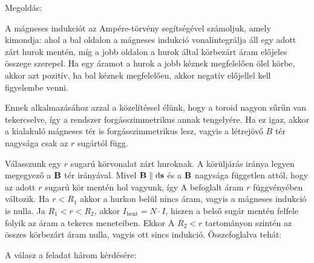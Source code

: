 
\ifdefined\megoldas
  
 Megoldás: 

 A mágneses indukciót az Amp\'ere-törvény segítségével számoljuk, amely kimondja:
 ahol a bal oldalon a mágneses indukció vonalintegrálja áll egy adott zárt hurok mentén, míg a jobb oldalon a hurok által körbezárt áram előjeles összege szerepel. Ha egy áramot a hurok a jobb kéznek megfelelően ölel körbe, akkor azt pozitív, ha bal kéznek megfelelően, akkor negatív előjellel kell figyelembe venni.

 Ennek alkalmazásához azzal a közelítéssel élünk, hogy a toroid nagyon sűrűn van tekercselve, így a rendszer forgásszimmetrikus annak tengelyére. Ha ez igaz, akkor a kialakuló mágneses tér is forgásszimmetrikus lesz, vagyis a létrejövő $B$ tér nagysága csak az $r$ sugártól függ. 

 Válasszunk egy $r$ sugarú körvonalat zárt huroknak. A körüljárás iránya legyen megegyező a $\mathbf{B}$ tér irányával. Mivel $\mathbf{B}\parallel \mathrm{d}\mathbf{s}$ és a $\mathbf{B}$ nagysága független attól, hogy az adott $r$ sugarú kör mentén hol vagyunk, így
 A befoglalt áram $r$ függvényében változik. Ha $r<R_1$ akkor a hurkon belül nincs áram, vagyis a mágneses indukció is nulla. Ja $R_1<r<R_2$, akkor $I_\text{bent} = N\cdot I$, hiszen a belső sugár mentén felfele folyik az áram a tekercs meneteiben. Ekkor
 A $R_2<r$ tartományon szintén az összes körbezárt áram nulla, vagyis ott sincs indukció. Összefoglalva tehát:

 A válasz a feladat három kérdésére:
 
\fi